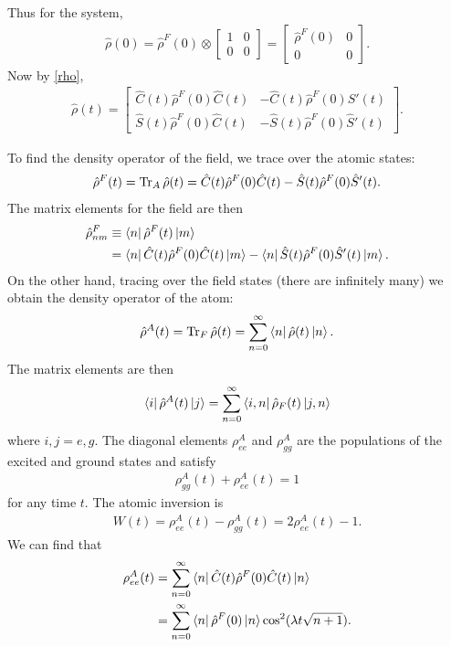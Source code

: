 \documentclass{book}
\theoremstyle{definition}
\begin{document}
Thus for the system,
\begin{align}
\hat{\rho}(0) = \hat{\rho}^F(0) \otimes \begin{bmatrix}
1 & 0 \\ 0 & 0
\end{bmatrix} = \begin{bmatrix}
\hat{\rho}^F(0) & 0 \\ 0 & 0 
\end{bmatrix}.
\end{align}
Now by \eqref{rho},
\begin{align}
\hat{\rho}(t) = \begin{bmatrix}
\hat{C}(t)\hat{\rho}^F(0)\hat{C}(t) & -\hat{C}(t)\hat{\rho}^F(0)\hat{S}'(t)\\
\hat{S}(t)\hat{\rho}^F(0)\hat{C}(t) & -\hat{S}(t)\hat{\rho}^F(0)\hat{S}'(t)
\end{bmatrix}.
\end{align}

To find the density operator of the field, we trace over the atomic states:
\begin{align}
\hat{\rho}^F(t) = \Tr_A \hat{\rho}(t) = \hat{C}(t)\hat{\rho}^F(0)\hat{C}(t) -\hat{S}(t)\hat{\rho}^F(0)\hat{S}'(t).
\end{align}
The matrix elements for the field are then
\begin{align}
\hat{\rho}^F_{nm} &\equiv \bra{n}\hat{\rho}^F(t)\ket{m} \\ 
&= \bra{n} \hat{C}(t)\hat{\rho}^F(0)\hat{C}(t) \ket{m} - \bra{n} \hat{S}(t)\hat{\rho}^F(0)\hat{S}'(t) \ket{m}.
\end{align}
On the other hand, tracing over the field states (there are infinitely many) we obtain the density operator of the atom:
\begin{align}
\hat{\rho}^A(t) = \Tr_F \hat{\rho}(t) = \sum^\infty_{n=0} \bra{n}\hat{\rho}(t)\ket{n}.
\end{align}
The matrix elements are then
\begin{align}
\bra{i}\hat{\rho}^A(t)\ket{j} = \sum^\infty_{n=0}\bra{i,n} \hat{\rho}_F(t)\ket{j,n}
\end{align}
where $i,j = e,g$. The diagonal elements $\rho^A_{ee}$ and $\rho^A_{gg}$ are the populations of the excited and ground states and satisfy
\begin{align}
\rho^A_{gg}(t) + \rho^A_{ee}(t) = 1
\end{align}
for any time $t$. The atomic inversion is
\begin{align}
W(t) = \rho^A_{ee}(t) - \rho^A_{gg}(t) = 2\rho^A_{ee}(t) - 1.
\end{align}
We can find that
\begin{align}
\rho^A_{ee}(t) &= \sum^\infty_{n=0}\bra{n}\hat{C}(t)\hat{\rho}^F(0)\hat{C}(t)\ket{n}\\
&= \sum^\infty_{n=0}\bra{n}\hat{\rho}^F(0)\ket{n}\cos^2(\lambda t \sqrt{n+1}).
\end{align}
\end{document}

